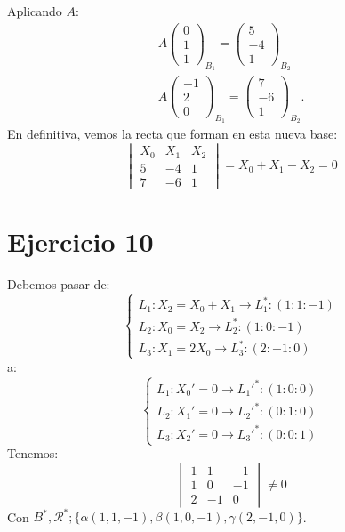 \documentclass[10pt,a4paper,openright]{book}
\theoremstyle{break}
\begin{document}
Aplicando $A$:
\begin{gather*}
    A \begin{pmatrix} 0\\ 1\\ 1 \end{pmatrix}_{B_1}  = \begin{pmatrix} 5\\ -4\\ 1 \end{pmatrix}_{B_2}\\
    A \begin{pmatrix} -1\\ 2\\ 0 \end{pmatrix}_{B_1}  = \begin{pmatrix} 7\\ -6\\ 1 \end{pmatrix}_{B_2} 
.\end{gather*}
En definitiva, vemos la recta que forman en esta nueva base:
\[
    \begin{vmatrix} X_0 & X_1 & X_2\\ 5 & -4 & 1\\ 7 & -6 & 1 \end{vmatrix} = \boxed{X_0 + X_1 - X_2 = 0} 
\]

\section{Ejercicio 10}%
\label{sec:ejercicio_10_3}
Debemos pasar de:
\[
\begin{cases}
    L_1 : X_2 = X_0 + X_1 \rightarrow L_1^* : \left( 1 : 1 : -1 \right) \\
    L_2 : X_0 = X_2 \rightarrow L_2^* : \left( 1 : 0 : -1 \right) \\
    L_3 : X_1 = 2X_0 \rightarrow L_3^* : \left( 2 : -1 : 0 \right) 
\end{cases} 
\]
a: 
\[
\begin{cases}
    L_1 : X_0' = 0 \rightarrow L_1'^* : \left( 1 : 0 : 0 \right) \\
    L_2 : X_1' = 0 \rightarrow L_2'^* : \left( 0 : 1 : 0 \right)\\
    L_3 : X_2' = 0 \rightarrow L_3'^* : \left( 0 : 0 : 1 \right)
\end{cases} 
\]
Tenemos:
\[
    \begin{vmatrix} 1 & 1 & -1\\ 1 & 0 & -1\\ 2 & -1 & 0 \end{vmatrix} \neq 0
\]
Con $B^*, \mathcal{R}^*; \{\alpha\left( 1, 1, -1 \right), \beta\left( 1, 0, -1 \right), \gamma\left( 2, -1, 0 \right)\}$.
\end{document}
